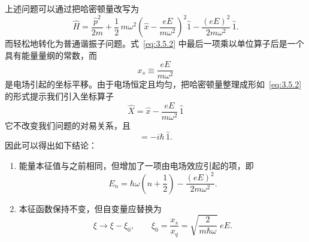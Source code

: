 上述问题可以通过把哈密顿量改写为
\begin{equation}
\hat H=\frac{\hat p^2}{2m}+\frac{1}{2}\,m\omega^2
\left(\hat x-\frac{eE}{m\omega^2}\right)^2\hat 1
-\frac{(eE)^2}{2m\omega^2}\,\hat 1.
\label{eq:3.5.2}
\end{equation}
而轻松地转化为普通谐振子问题。式~\eqref{eq:3.5.2} 中最后一项乘以单位算子后是一个具有能量量纲的常数，而
\begin{equation}
x_s\equiv\frac{eE}{m\omega^2}
\label{eq:3.5.3}
\end{equation}
是电场引起的坐标平移。由于电场恒定且均匀，把哈密顿量整理成形如~\eqref{eq:3.5.2} 的形式提示我们引入坐标算子
\begin{equation}
\hat X=\hat x-\frac{eE}{m\omega^2}\,\hat 1
\label{eq:3.5.4}
\end{equation}
它不改变我们问题的对易关系，且
\begin{equation}
[\hat p,\hat X]=-i\hbar\,\hat 1.
\label{eq:3.5.5}
\end{equation}
因此可以得出如下结论：
\begin{enumerate}
\item 能量本征值与之前相同，但增加了一项由电场效应引起的项，即
      \begin{equation}
      E_n=\hbar\omega\!\left(n+\frac{1}{2}\right)-\frac{(eE)^2}{2m\omega^2}.
      \label{eq:3.5.6}
      \end{equation}
\item 本征函数保持不变，但自变量应替换为
      \begin{equation}
      \xi\to\xi-\xi_0,\qquad
      \xi_0=\frac{x_s}{x_q}=\sqrt{\frac{2}{m\hbar\omega}}\;eE.
      \label{eq:3.5.7}
      \end{equation}
\end{enumerate}

